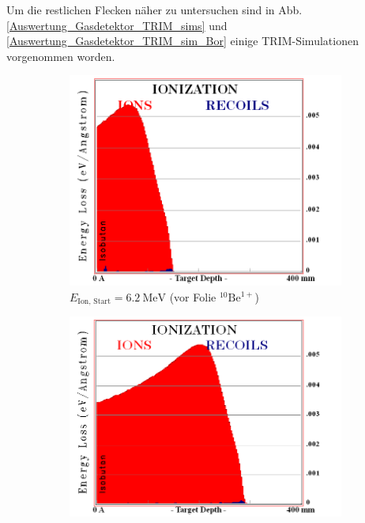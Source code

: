Um die restlichen Flecken näher zu untersuchen sind in Abb. \ref{Auswertung_Gasdetektor_TRIM_sims} und \ref{Auswertung_Gasdetektor_TRIM_sim_Bor} einige TRIM-Simulationen vorgenommen worden.
\begin{figure}[h]
    \begin{subfigure}{0.45\textwidth}
        \centering
        \includegraphics[width=0.95\linewidth]{Pictures/TRIM_Ionisierung_10Be_in_Isobutan_vorher_1+.png}
        \caption{$E_{\text{Ion, Start}} = \SI{6.2}{\mega\electronvolt}$ (vor Folie $^{10}\text{Be}^{1+}$)}
        \label{Auswertung_Gasdetektor_TRIM_sims_a}
    \end{subfigure} \qquad
    \begin{subfigure}{0.45\textwidth}
        \centering
        \includegraphics[width=0.95\linewidth]{Pictures/TRIM_Ionisierung_10Be_in_Isobutan_vorher_2+.png}

\end{subfigure}
\end{figure}
